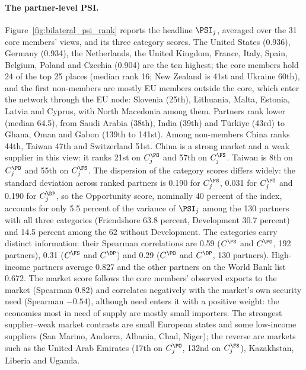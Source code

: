 \paragraph{The partner-level PSI.} Figure~\ref{fig:bilateral_psi_rank} reports the headline
$\PSI_j$, averaged over the 31 core members' views, and its three category scores. The United
States (0.936), Germany (0.934), the Netherlands, the United Kingdom, France, Italy, Spain,
Belgium, Poland and Czechia (0.904) are the ten highest; the core members hold 24 of the top 25
places (median rank 16; New Zealand is 41st and Ukraine 60th), and the first non-members are
mostly EU members outside the core, which enter the network through the EU node: Slovenia (25th),
Lithuania, Malta, Estonia, Latvia and Cyprus, with North Macedonia among them. Partners rank lower (median 64.5), from Saudi Arabia (38th), India (39th) and Türkiye (43rd)
to Ghana, Oman and Gabon (139th to 141st). Among non-members China ranks 44th, Taiwan 47th and
Switzerland 51st. China is a strong market and a weak supplier in this view: it ranks 21st on
$C^{\PO}_j$ and 57th on $C^{\FS}_j$. Taiwan is 8th on $C^{\PO}_j$ and 55th on $C^{\FS}_j$. The
dispersion of the category scores differs widely: the standard deviation across ranked partners
is 0.190 for $C^{\FS}_j$, 0.031 for $C^{\PO}_j$ and 0.190 for $C^{\DP}_j$, so the Opportunity
score, nominally 40 percent of the index, accounts for only 5.5 percent of the variance of
$\PSI_j$ among the 130 partners with all three categories (Friendshore 63.8 percent, Development
30.7 percent) and 14.5 percent among the 62 without Development. The categories carry distinct
information: their Spearman correlations are 0.59 ($C^{\FS}$ and $C^{\PO}$, 192 partners), 0.31
($C^{\FS}$ and $C^{\DP}$) and 0.29 ($C^{\PO}$ and $C^{\DP}$, 130 partners). High-income partners
average 0.827 and the other partners on the World Bank list 0.672. The market score follows the core members' observed exports to the market (Spearman 0.82) and
correlates negatively with the market's own security need (Spearman $-0.54$), although need enters
it with a positive weight: the economies most in need of supply are mostly small importers. The strongest supplier--weak market contrasts are small
European states and some low-income suppliers (San Marino, Andorra, Albania, Chad, Niger); the
reverse are markets such as the United Arab Emirates (17th on $C^{\PO}_j$, 132nd on $C^{\FS}_j$),
Kazakhstan, Liberia and Uganda.

